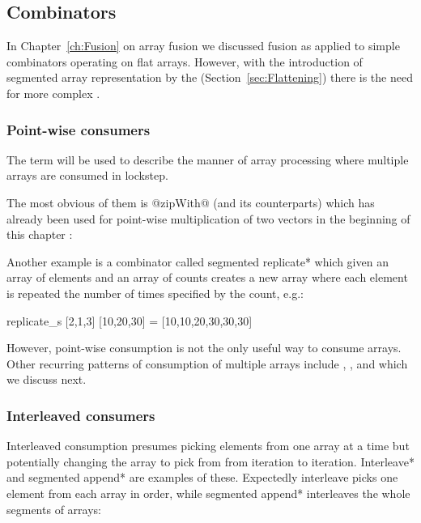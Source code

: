 \documentclass[preamble.tex]{subfiles}
\begin{document}
\subsection{\DPH Combinators}
\label{sec:DPH-Combinators}

In Chapter~\ref{ch:Fusion} on array fusion we discussed fusion as applied to simple combinators operating on flat arrays. However, with the introduction of segmented array representation by the  (Section~\ref{sec:Flattening}) there is the need for more complex .\isegcomb

\subsubsection{Point-wise consumers}

The term  will be used to describe the manner of array processing where multiple arrays are consumed in lockstep.

The most obvious of them is @zipWith@ (and its  counterparts) which has already been used for point-wise multiplication of two vectors in the beginning of this chapter :


Another example is a combinator called \*segmented replicate* which given an array of elements and an array of counts creates a new array where each element is repeated the number of times specified by the count, e.g.:

\begin{hscode}
replicate_s [2,1,3] [10,20,30] = [10,10,20,30,30,30]
\end{hscode}


However, point-wise consumption is not the only useful way to consume arrays. Other recurring patterns of consumption of multiple arrays include , ,  and  which we discuss next.


\subsubsection{Interleaved consumers}

Interleaved consumption presumes picking elements from one array at a time but potentially changing the array to pick from from iteration to iteration. \*Interleave* and \*segmented append* are examples of these. Expectedly interleave picks one element from each array in order, while \*segmented append* interleaves the whole segments of arrays:
\end{document}
